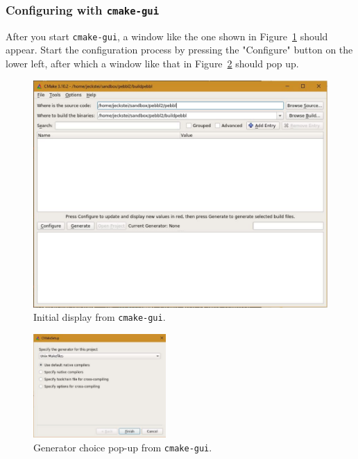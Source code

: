 \subsubsection{Configuring with \texttt{cmake-gui}}
After you start \texttt{cmake-gui}, a window like the one shown in
Figure~\ref{fig:cmake1} should appear.  Start the configuration process by
pressing the "Configure" button on the lower left, after which a window like
that in Figure~\ref{fig:cmake-choosegen} should pop up.

\begin{figure}[tpb]
\begin{center}
\includegraphics[height=0.45\textheight]{cmake1}
\vspace{-0.3in}
\end{center}
\caption{Initial display from \texttt{cmake-gui}.\label{fig:cmake1}}
\end{figure}

\begin{figure}[tpb]
\begin{center}
\includegraphics[width=0.45\textwidth]{cmake-choosegen}
\vspace{-0.3in}
\end{center}
\caption{Generator choice pop-up from \texttt{cmake-gui}.\label{fig:cmake-choosegen}}
\end{figure}

